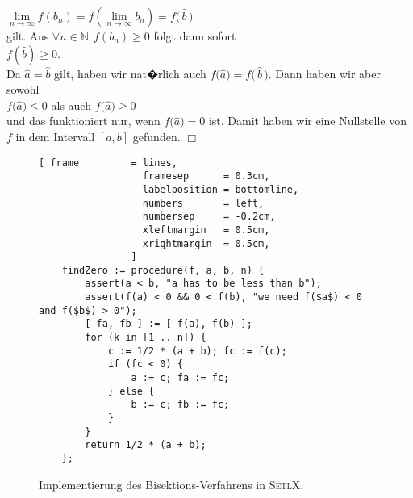 \hspace*{1.3cm}
$\lim\limits_{n\rightarrow\infty} f(b_n) = f\left(\lim\limits_{n\rightarrow\infty}
  b_n\right) = f\bigl(\,\widehat{b}\,\bigr)$ 
\\[0.3cm]
gilt.  Aus $\forall n\in\mathbb{N}: f(b_n) \geq 0$ folgt dann sofort
\\[0.2cm]
\hspace*{1.3cm}
$f(\widehat{b}) \geq 0$.
\\[0.2cm]
Da $\widehat{a} = \widehat{b}$ gilt, haben wir nat�rlich auch 
$f\bigl(\widehat{a}\bigr) = f\bigl(\,\widehat{b}\,\bigr)$.  Dann haben wir aber sowohl
\\[0.2cm]
\hspace*{1.3cm}
$f\bigl(\widehat{a}\bigr) \leq 0$ \quad als auch \quad $f\bigl(\widehat{a}\bigr) \geq 0$ 
\\[0.2cm]
und das funktioniert nur, wenn $f\bigl(\widehat{a}\bigr) = 0$ ist.  Damit haben wir eine
Nullstelle von $f$ in dem Intervall $[a,b]$ gefunden.
\hspace*{\fill} $\Box$
\vspace*{0.3cm}

\begin{figure}[!ht]
  \centering
\begin{Verbatim}[ frame         = lines, 
                  framesep      = 0.3cm, 
                  labelposition = bottomline,
                  numbers       = left,
                  numbersep     = -0.2cm,
                  xleftmargin   = 0.5cm,
                  xrightmargin  = 0.5cm,
                ]
    findZero := procedure(f, a, b, n) {
        assert(a < b, "a has to be less than b");   
        assert(f(a) < 0 && 0 < f(b), "we need f($a$) < 0 and f($b$) > 0");
        [ fa, fb ] := [ f(a), f(b) ]; 
        for (k in [1 .. n]) {
            c := 1/2 * (a + b); fc := f(c); 
            if (fc < 0) {
                a := c; fa := fc; 
            } else {
                b := c; fb := fc; 
            }
        }
        return 1/2 * (a + b);
    };
\end{Verbatim}
\vspace*{-0.3cm}
  \caption{Implementierung des Bisektions-Verfahrens in \textsc{SetlX}.}
  \label{fig:bisection.setlx}
\end{figure} %

